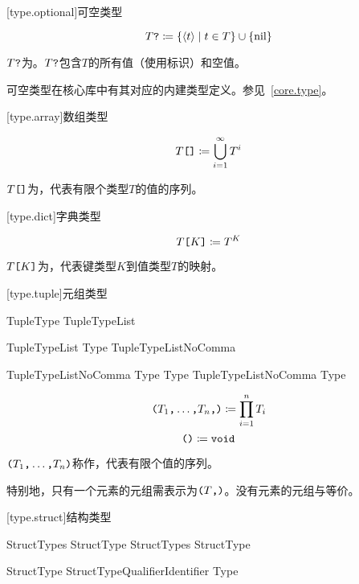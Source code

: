 [type.optional]{可空类型}

$$ T\texttt{?} \coloneqq \{ \langle t \rangle \mid t \in T \} \cup \{ \mathrm{nil} \} $$

\pnum
$T\texttt{?}$为。$T\texttt{?}$包含$T$的所有值（使用标识）和空值。

\pnum
可空类型在核心库中有其对应的内建类型定义。参见~\ref{core.type}。

[type.array]{数组类型}

$$ T\texttt{[]} \coloneqq \bigcup^\infty_{i=1} T^i $$

\pnum
$T\texttt{[]}$为，代表有限个类型$T$的值的序列。

[type.dict]{字典类型}

$$ T\texttt{[}K\texttt{]} \coloneqq T^K $$

\pnum
$T\texttt{[}K\texttt{]}$为，代表键类型$K$到值类型$T$的映射。

[type.tuple]{元组类型}

\begin{bnf}{TupleType}
    \terminal{(} TupleTypeList \terminal{)}
\end{bnf}

\begin{bnf}{TupleTypeList}
    Type \terminal{,} \br
    TupleTypeListNoComma \terminal{,}\bnfq
\end{bnf}

\begin{bnf}{TupleTypeListNoComma}
    Type \terminal{,} Type \br
    TupleTypeListNoComma \terminal{,} Type
\end{bnf}

$$ \texttt{(}T_1\texttt{,} \ldots\texttt{,} T_n\texttt{,}\texttt{)} \coloneqq \prod^n_{i=1} T_i $$
$$ \texttt{()} \coloneqq \texttt{void} $$

\pnum
$\texttt{(}T_1\texttt{,} \ldots\texttt{,} T_n\texttt{)}$称作，代表有限个值的序列。

\pnum
特别地，只有一个元素的元组需表示为$\texttt{(}T\texttt{,)}$。没有元素的元组与等价。

[type.struct]{结构类型}

\begin{bnf}{StructTypes}
    StructType \br
    StructTypes \terminal{,} StructType
\end{bnf}

\begin{bnf}{StructType}
    StructTypeQualifier\bnfs Identifier \terminal{:} Type
\end{bnf}

